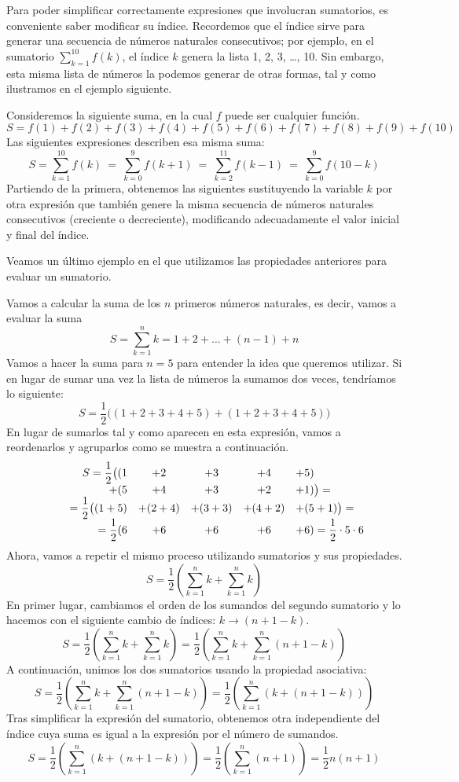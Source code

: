 Para poder simplificar correctamente expresiones que involucran sumatorios, es conveniente saber modificar su índice.
Recordemos que el índice sirve para generar una secuencia de números naturales consecutivos; por ejemplo, en el sumatorio $\displaystyle\sum_{k=1}^{10}f(k)$, el índice $k$ genera la lista 1, 2, 3, \dots, 10.
Sin embargo, esta misma lista de números la podemos generar de otras formas, tal y como ilustramos en el ejemplo siguiente.
%
\begin{ejemplo}\label{ej:indices}
Consideremos la siguiente suma, en la cual $f$ puede ser cualquier función.
\[
S=f(1)+f(2)+f(3)+f(4)+f(5)+f(6)+f(7)+f(8)+f(9)+f(10)
\]
Las siguientes expresiones describen esa misma suma:
\[
S=\sum_{k=1}^{10} f(k)\ = \ 
\sum_{k=0}^9 f(k+1)\ = \ 
\sum_{k=2}^{11} f(k-1)\ = \ 
\sum_{k=0}^{9} f(10-k)\]
Partiendo de la primera, obtenemos las siguientes sustituyendo la variable $k$ por otra expresión que también genere la misma secuencia de números naturales consecutivos (creciente o decreciente), modificando adecuadamente el valor inicial y final del índice.\fej
\end{ejemplo}

Veamos un último ejemplo en el que utilizamos las propiedades anteriores para evaluar un sumatorio.
%
\begin{ejemplo}\label{ej:suma1n}
Vamos a calcular la suma de los $n$ primeros números naturales, es decir, vamos a evaluar la suma
\[
S = \sum_{k=1}^n k = 1+2+\dots+(n-1)+n
\]
Vamos a hacer la suma para $n=5$ para entender la idea que queremos utilizar.
Si en lugar de sumar una vez la lista de números la sumamos dos veces, tendríamos lo siguiente:
\[
S=\frac12\big((1+2+3+4+5)+(1+2+3+4+5)\big)
\]
En lugar de sumarlos tal y como aparecen en esta expresión, vamos a reordenarlos y agruparlos como se muestra a continuación.
\[
\begin{array}{rcccl}
S=\dfrac12\big((1&+2&+3&+4&+5)\\
         +(5&+4&+3&+2&+1)\big)=\\
\multicolumn{1}{c}{\rule{0pt}{0pt}\qquad=\dfrac12\big((1+5)}&+(2+4)&+(3+3)&+(4+2)&+(5+1)\big)=\\
=\dfrac12(6&+6&+6&+6&+6)=\dfrac12\cdot5\cdot 6\\
\end{array}
\]
Ahora, vamos a repetir el mismo proceso utilizando sumatorios y sus propiedades.
\[
S=\frac12\left(\sum_{k=1}^n k + \sum_{k=1}^n k\right)
\]
En primer lugar, cambiamos el orden de los sumandos del segundo sumatorio y lo hacemos con el siguiente cambio de índices: $k\to (n+1-k)$.
\[
S=\frac12\left(\sum_{k=1}^n k + \sum_{k=1}^n k\right) =
\frac12\left(\sum_{k=1}^n k + \sum_{k=1}^n (n+1-k)\right)
\]
A continuación, unimos los dos sumatorios usando la propiedad asociativa:
\[
S=\frac12\left(\sum_{k=1}^n k + \sum_{k=1}^n (n+1-k)\right) =\frac12\left(\sum_{k=1}^n (k +(n+1-k))\right)
\]
Tras simplificar la expresión del sumatorio, obtenemos otra independiente del índice cuya suma es igual a la expresión por el número de sumandos.
\[
S=\frac12\left(\sum_{k=1}^n (k +(n+1-k))\right) =
\frac12\left(\sum_{k=1}^n (n+1)\right) =\frac12n(n+1)\tag*{\fej}
\]
\end{ejemplo}

